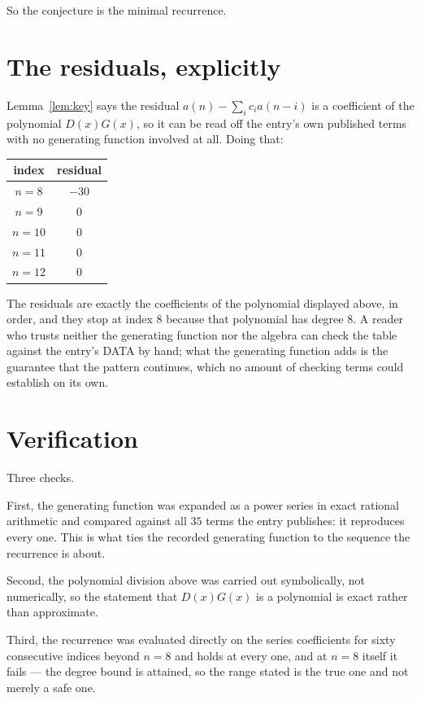 \documentclass[11pt,a4paper]{article}
\theoremstyle{plain}
\theoremstyle{definition}
\begin{document}
So the conjecture is the minimal recurrence.

\section{The residuals, explicitly}

Lemma~\ref{lem:key} says the residual $a(n)-\sum_ic_ia(n-i)$ is a coefficient of the
polynomial $D(x)G(x)$, so it can be read off the entry's own published terms with no
generating function involved at all. Doing that:
\begin{center}
\begin{tabular}{cc}
index & residual \\ \hline
$n=8$ & $-30$ \\
$n=9$ & $0$ \\
$n=10$ & $0$ \\
$n=11$ & $0$ \\
$n=12$ & $0$
\end{tabular}
\end{center}
The residuals are exactly the coefficients of the polynomial displayed above, in order, and
they stop at index $8$ because that polynomial has degree $8$. A reader who trusts
neither the generating function nor the algebra can check the table against the entry's DATA
by hand; what the generating function adds is the guarantee that the pattern continues, which
no amount of checking terms could establish on its own.

\section{Verification}

Three checks.

First, the generating function was expanded as a power series in exact rational arithmetic and
compared against all $35$ terms the entry publishes: it reproduces every one. This is
what ties the recorded generating function to the sequence the recurrence is about.

Second, the polynomial division above was carried out symbolically, not numerically, so the
statement that $D(x)G(x)$ is a polynomial is exact rather than approximate.

Third, the recurrence was evaluated directly on the series coefficients for sixty consecutive
indices beyond $n=8$ and holds at every one, and at $n=8$ itself it fails --- the
degree bound is attained, so the range stated is the true one and not merely a safe one.
\end{document}
